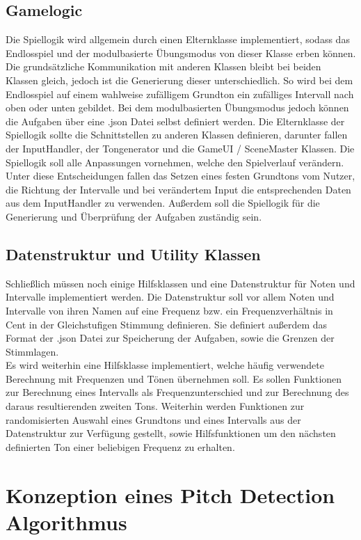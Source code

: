 \subsection{Gamelogic}
Die Spiellogik wird allgemein durch einen Elternklasse implementiert, sodass das Endlosspiel und der modulbasierte Übungsmodus von dieser Klasse erben können. Die grundsätzliche Kommunikation mit anderen Klassen bleibt bei beiden Klassen gleich, jedoch ist die Generierung dieser unterschiedlich. So wird bei dem Endlosspiel auf einem wahlweise zufälligem Grundton ein zufälliges Intervall nach oben oder unten gebildet. Bei dem modulbasierten Übungsmodus jedoch können die Aufgaben über eine .json Datei selbst definiert werden. Die Elternklasse der Spiellogik sollte die Schnittstellen zu anderen Klassen definieren, darunter fallen der InputHandler, der Tongenerator und die GameUI / SceneMaster Klassen. Die Spiellogik soll alle Anpassungen vornehmen, welche den Spielverlauf verändern. Unter diese Entscheidungen fallen das Setzen eines festen Grundtons vom Nutzer, die Richtung der Intervalle und bei verändertem Input die entsprechenden Daten aus dem InputHandler zu verwenden. Außerdem soll die Spiellogik für die Generierung und Überprüfung der Aufgaben zuständig sein.

\subsection{Datenstruktur und Utility Klassen}
Schließlich müssen noch einige Hilfsklassen und eine Datenstruktur für Noten und Intervalle implementiert werden. Die Datenstruktur soll vor allem Noten und Intervalle von ihren Namen auf eine Frequenz bzw. ein Frequenzverhältnis in Cent in der Gleichstufigen Stimmung definieren. Sie definiert außerdem das Format der .json Datei zur Speicherung der Aufgaben, sowie die Grenzen der Stimmlagen. \\ 
Es wird weiterhin eine Hilfsklasse implementiert, welche häufig verwendete Berechnung mit Frequenzen und Tönen übernehmen soll. Es sollen Funktionen zur Berechnung eines Intervalls als Frequenzunterschied und zur Berechnung des daraus resultierenden zweiten Tons. Weiterhin werden Funktionen zur randomisierten Auswahl eines Grundtons und eines Intervalls aus der Datenstruktur zur Verfügung gestellt, sowie Hilfsfunktionen um den nächsten definierten Ton einer beliebigen Frequenz zu erhalten.

\section{Konzeption eines Pitch Detection Algorithmus}


